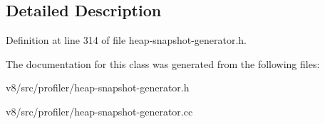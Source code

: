 \subsection{Detailed Description}


Definition at line 314 of file heap-\/snapshot-\/generator.\+h.



The documentation for this class was generated from the following files\+:\begin{DoxyCompactItemize}
\item 
v8/src/profiler/heap-\/snapshot-\/generator.\+h\item 
v8/src/profiler/heap-\/snapshot-\/generator.\+cc\end{DoxyCompactItemize}

